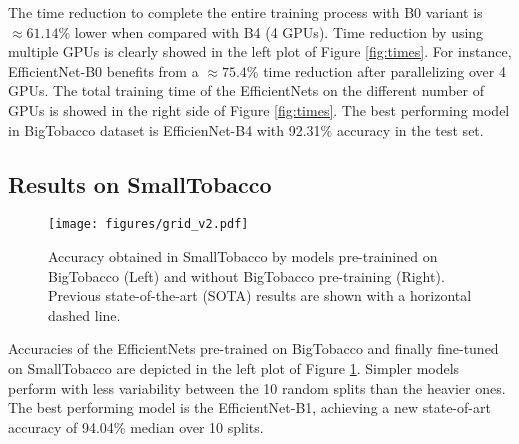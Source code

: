 \documentclass[runningheads]{llncs}
\begin{document}
\begin{comment}
(As it can be seen, there is almost no difference in accuracy between EfficientNet models. In fact, even though EfficientNet-B0 has 5.2 million of parameters compared to 19 million of EfficientNet-B4, the accuracy obtained is very similar.)

(Furthermore, )
\end{comment}
The time reduction to complete the entire training process with B0 variant is $\approx 61.14\%$ lower when compared with B4 (4 GPUs). Time reduction by using multiple GPUs is clearly showed in the left plot of Figure \ref{fig:times}. For instance, EfficientNet-B0 benefits from a $\approx 75.4\%$ time reduction after parallelizing over 4 GPUs. The total training time of the EfficientNets on the different number of GPUs is showed in the right side of Figure \ref{fig:times}. The best performing model in BigTobacco dataset is EfficienNet-B4 with 92.31\% accuracy in the test set.

\begin{comment}
Note that the accuracy value of 92.31\% obtained in BigTobacco dataset have been achieved using Pytorch's DataParallel library, although the difference with DistributedDataParallel results is almost negligible.
\end{comment}


\subsection{Results on SmallTobacco}\label{sec:results_smalltobacco}

\begin{figure}
	\begin{centering}
	\texttt{[image: figures/grid\_v2.pdf]}
	\caption{Accuracy obtained in SmallTobacco by models pre-trainined on BigTobacco (Left) and without BigTobacco pre-training (Right). Previous state-of-the-art (SOTA) results are shown with a horizontal dashed line.}
	\label{fig:finetuning}
	\end{centering}
\end{figure}

Accuracies of the EfficientNets pre-trained on BigTobacco and finally fine-tuned on SmallTobacco are depicted in the left plot of Figure \ref{fig:finetuning}. Simpler models perform with less variability between the 10 random splits than the heavier ones. The best performing model is the EfficientNet-B1, achieving a new state-of-art accuracy of 94.04\% median over 10 splits.
\end{document}
